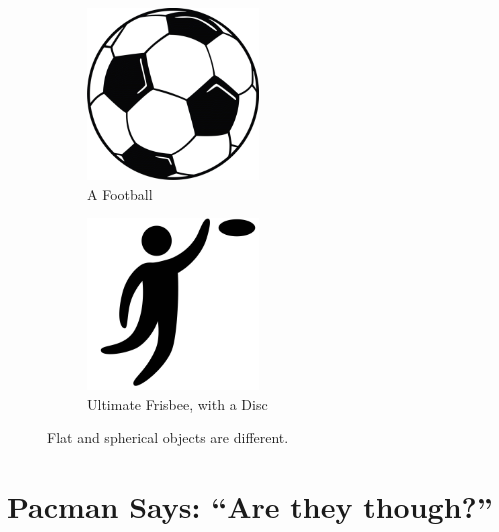 \documentclass{article}
\begin{document}
\begin{figure}[t]
  \begin{subfigure}{0.5\textwidth}
    \centering
    \includegraphics[width=0.5\textwidth]{images/football.png}
    \caption{A Football}
    \label{fig:football}
  \end{subfigure}
  \begin{subfigure}{0.5\textwidth}
    \centering
    \includegraphics[width=0.5\textwidth]{images/frisbee.png}
    \caption{Ultimate Frisbee, with a Disc}
    \label{fig:frisbee}
  \end{subfigure}
  \caption{Flat and spherical objects are different.}
  \label{fig:football-vs-frisbee}
\end{figure}

\section{Pacman Says: ``Are they though?''}
\begin{figure}
\end{figure}
\end{document}
